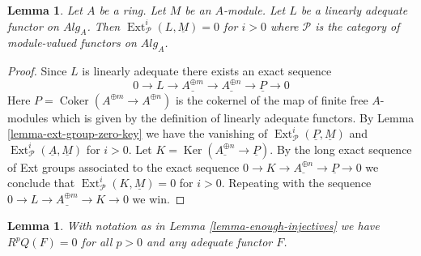 \documentclass{stacks-project}
\theoremstyle{plain}
\newtheorem{lemma}[subsection]{Lemma}
\theoremstyle{definition}
\theoremstyle{remark}
\numberwithin{equation}{subsection}
\def\Ext{\mathop{\mathrm{Ext}}\nolimits}
\def\Ker{\mathop{\mathrm{Ker}}}
\def\Coker{\mathop{\mathrm{Coker}}}
\begin{document}
\begin{lemma}
\label{lemma-ext-group-zero}
Let $A$ be a ring. Let $M$ be an $A$-module. Let $L$ be a linearly
adequate functor on $\textit{Alg}_A$. Then
$\Ext^i_\mathcal{P}(L, \underline{M}) = 0$
for $i > 0$ where $\mathcal{P}$ is the category of module-valued
functors on $\textit{Alg}_A$.
\end{lemma}

\begin{proof}
Since $L$ is linearly adequate there exists an exact sequence
$$
0 \to L \to \underline{A^{\oplus m}} \to \underline{A^{\oplus n}} \to
\underline{P} \to 0
$$
Here $P = \Coker(A^{\oplus m} \to A^{\oplus n})$ is the cokernel
of the map of finite free $A$-modules which is given by the definition
of linearly adequate functors. By
Lemma \ref{lemma-ext-group-zero-key}
we have the vanishing of
$\Ext^i_\mathcal{P}(\underline{P}, \underline{M})$
and
$\Ext^i_\mathcal{P}(\underline{A}, \underline{M})$
for $i > 0$.
Let $K = \Ker(\underline{A^{\oplus n}} \to \underline{P})$.
By the long exact sequence of Ext groups associated to the exact sequence
$0 \to K \to \underline{A^{\oplus n}} \to \underline{P} \to 0$
we conclude that
$\Ext^i_\mathcal{P}(K, \underline{M}) = 0$ for $i > 0$.
Repeating with the sequence
$0 \to L \to \underline{A^{\oplus m}} \to K \to 0$
we win.
\end{proof}

\begin{lemma}
\label{lemma-RQ-zero}
With notation as in
Lemma \ref{lemma-enough-injectives}
we have $R^pQ(F) = 0$ for all $p > 0$ and any adequate functor $F$.
\end{lemma}
\end{document}
